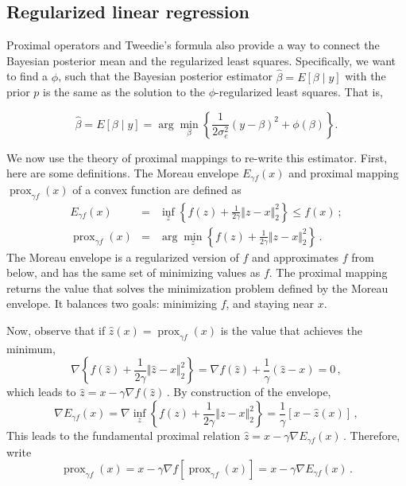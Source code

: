 \documentclass[11pt]{article}%
\newcommand{\prox}{ \mathop{\mathrm{prox}} }
\newcommand{\enorm}[1]{\Vert #1 \Vert_2}
\numberwithin{equation}{section}
\theoremstyle{plain}
\begin{document}
\subsection{Regularized linear regression}

Proximal operators and Tweedie's formula also provide a way to connect the Bayesian posterior mean and the regularized least squares.  Specifically, we want to find a $\phi$, such that the Bayesian posterior estimator $\hat{\beta} = E\left[ \beta \mid y \right]$ with the prior $p$ is the same as the solution to the $\phi$-regularized least squares.  That is,

\begin{equation}
\label{obj:pmreg}
\hat{\beta} = E\left[ \beta \mid y \right] = \arg\min_\beta \left\{\frac1{2\sigma_e^2}(y -\beta)^2 + \phi(\beta)\right\}.
\end{equation}

We now use the theory of proximal mappings to re-write this estimator.  First, here are some definitions.  The Moreau envelope $E_{\gamma f} (x)$ and proximal mapping $\prox_{\gamma f} (x)$ of a convex function are defined as
\begin{equation}
\label{def:prox}
\begin{array}{rcl}
E_{\gamma f} (x) &=& \inf_{z } \left\{f(z) + \frac{1}{2\gamma} \enorm{z - x}^2  \right\}  \leq f(x) \ ;\\
\prox_{\gamma f} (x) &=& \arg \min_{z } \left\{  f(z)+ \frac{1}{2\gamma} \enorm{z - x}^2  \right\} \, .
\end{array}
\end{equation}
The Moreau envelope is a regularized version of $f$ and approximates $f$ from below, and has the same set of minimizing values as $f$.  
The proximal mapping returns the value that solves the minimization problem defined by the Moreau envelope.  It balances two goals: minimizing $f$, and staying near $x$. 

Now, observe that if $\hat{z}(x) = \prox_{\gamma f}(x)$ is the value that achieves the minimum,
$$
\nabla \left\{f(\hat z) + \frac{1}{2\gamma} \enorm{\hat z - x}^2  \right\}
=\nabla f(\hat z) + \frac1\gamma(\hat z - x) = 0 \, ,
$$
which leads to $\hat z = x - \gamma\nabla f(\hat z) \, .$ By construction of the envelope,
$$
\nabla E_{\gamma f}(x) = \nabla  \inf_{z } \left\{f(z) + \frac{1}{2\gamma} \enorm{z - x}^2  \right\} = \frac{1}{\gamma}[x - \hat{z}(x)] \, ,
$$
This leads to the fundamental proximal relation $\hat z = x - \gamma \nabla E_{\gamma f}(x) \, .$
Therefore, write
\begin{equation}
\label{eq:prox}
\prox_{\gamma f}(x) = x - \gamma\nabla f\left[\prox_{\gamma f}(x)\right] = x - \gamma \nabla E_{\gamma f}(x) \, .
\end{equation}
\end{document}
